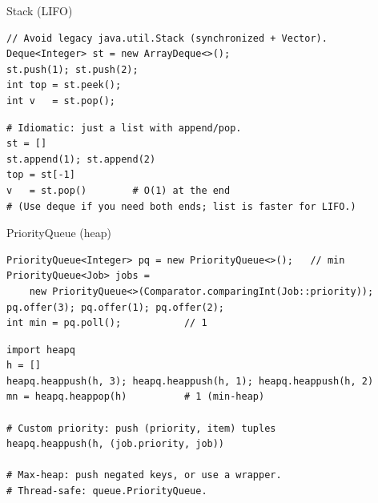 \documentclass[10pt]{article}
\begin{document}
\begin{construct}{Stack (LIFO)}
\noindent
\begin{minipage}[t]{0.485\linewidth}
\begin{lstlisting}[style=java, title=Java]
// Avoid legacy java.util.Stack (synchronized + Vector).
Deque<Integer> st = new ArrayDeque<>();
st.push(1); st.push(2);
int top = st.peek();
int v   = st.pop();
\end{lstlisting}
\end{minipage}\hfill
\begin{minipage}[t]{0.485\linewidth}
\begin{lstlisting}[style=python, title=Python]
# Idiomatic: just a list with append/pop.
st = []
st.append(1); st.append(2)
top = st[-1]
v   = st.pop()        # O(1) at the end
# (Use deque if you need both ends; list is faster for LIFO.)
\end{lstlisting}
\end{minipage}
\end{construct}

\begin{construct}{PriorityQueue (heap)}
\noindent
\begin{minipage}[t]{0.485\linewidth}
\begin{lstlisting}[style=java, title=Java]
PriorityQueue<Integer> pq = new PriorityQueue<>();   // min
PriorityQueue<Job> jobs =
    new PriorityQueue<>(Comparator.comparingInt(Job::priority));
pq.offer(3); pq.offer(1); pq.offer(2);
int min = pq.poll();           // 1
\end{lstlisting}
\end{minipage}\hfill
\begin{minipage}[t]{0.485\linewidth}
\begin{lstlisting}[style=python, title=Python]
import heapq
h = []
heapq.heappush(h, 3); heapq.heappush(h, 1); heapq.heappush(h, 2)
mn = heapq.heappop(h)          # 1 (min-heap)

# Custom priority: push (priority, item) tuples
heapq.heappush(h, (job.priority, job))

# Max-heap: push negated keys, or use a wrapper.
# Thread-safe: queue.PriorityQueue.
\end{lstlisting}
\end{minipage}
\end{construct}

\end{document}
